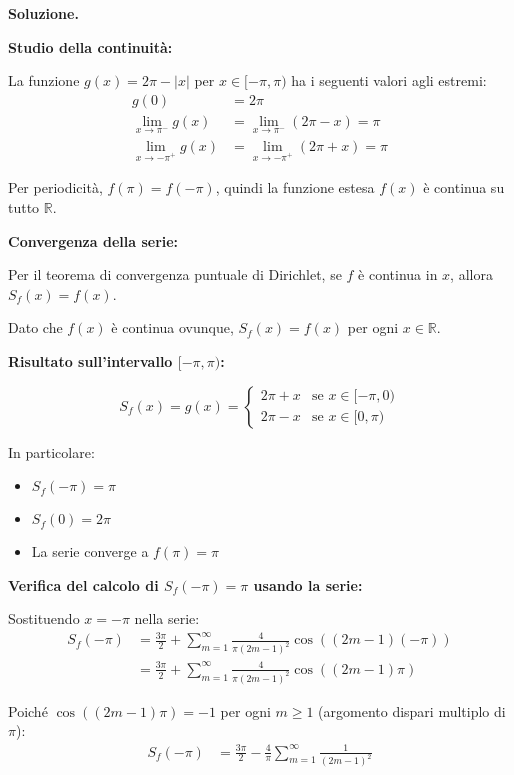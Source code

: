 \documentclass[12pt, a4paper]{article}
\newenvironment{solution}{%
    \par\noindent\textbf{Soluzione.}\medskip\par
    \normalfont
}{\par\bigskip}
\begin{document}
\begin{solution}
\begin{enumerate}
    \textbf{Studio della continuità:}
    
    La funzione $g(x) = 2\pi - |x|$ per $x \in [-\pi, \pi)$ ha i seguenti valori agli estremi:
    \begin{align}
        g(0) &= 2\pi \\
        \lim_{x \to \pi^-} g(x) &= \lim_{x \to \pi^-} (2\pi-x) = \pi \\
        \lim_{x \to -\pi^+} g(x) &= \lim_{x \to -\pi^+} (2\pi+x) = \pi
    \end{align}
    
    Per periodicità, $f(\pi) = f(-\pi)$, quindi la funzione estesa $f(x)$ è continua su tutto $\mathbb{R}$.
    
    \textbf{Convergenza della serie:}
    
    Per il teorema di convergenza puntuale di Dirichlet, se $f$ è continua in $x$, allora $S_f(x) = f(x)$.
    
    Dato che $f(x)$ è continua ovunque, $S_f(x) = f(x)$ per ogni $x \in \mathbb{R}$.
    
    \textbf{Risultato sull'intervallo $[-\pi, \pi)$:}
    
    \[S_f(x) = g(x) = \begin{cases} 
        2\pi+x & \text{se } x \in [-\pi,0) \\ 
        2\pi-x & \text{se } x \in [0,\pi) 
    \end{cases}\]
    
    In particolare:
    \begin{itemize}
        \item $S_f(-\pi) = \pi$
        \item $S_f(0) = 2\pi$
        \item La serie converge a $f(\pi) = \pi$
    \end{itemize}
    
    \textbf{Verifica del calcolo di $S_f(-\pi) = \pi$ usando la serie:}
    
    Sostituendo $x = -\pi$ nella serie:
    \begin{align}
        S_f(-\pi) &= \frac{3\pi}{2} + \sum_{m=1}^{\infty} \frac{4}{\pi (2m-1)^2} \cos((2m-1)(-\pi)) \\
        &= \frac{3\pi}{2} + \sum_{m=1}^{\infty} \frac{4}{\pi (2m-1)^2} \cos((2m-1)\pi)
    \end{align}
    
    Poiché $\cos((2m-1)\pi) = -1$ per ogni $m \geq 1$ (argomento dispari multiplo di $\pi$):
    \begin{align}
        S_f(-\pi) &= \frac{3\pi}{2} - \frac{4}{\pi} \sum_{m=1}^{\infty} \frac{1}{(2m-1)^2}
    \end{align}
    

\end{enumerate}
\end{solution}
\end{document}
